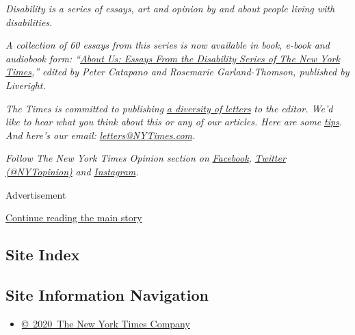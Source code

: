 \emph{Disability is a series of essays, art and opinion by and about
people living with disabilities.}

\emph{A collection of 60 essays from this series is now available in
book, e-book and audiobook form:
``}\href{https://www.aboutusbook.com/}{\emph{About Us: Essays From the
Disability Series of The New York Times}}\emph{,'' edited by Peter
Catapano and Rosemarie Garland-Thomson, published by Liveright.}

\emph{The Times is committed to publishing}
\href{https://www.nytimes3xbfgragh.onion/2019/01/31/opinion/letters/letters-to-editor-new-york-times-women.html}{\emph{a
diversity of letters}} \emph{to the editor. We'd like to hear what you
think about this or any of our articles. Here are some}
\href{https://help.nytimes3xbfgragh.onion/hc/en-us/articles/115014925288-How-to-submit-a-letter-to-the-editor}{\emph{tips}}\emph{.
And here's our email:}
\href{mailto:letters@NYTimes.com}{\emph{letters@NYTimes.com}}\emph{.}

\emph{Follow The New York Times Opinion section on}
\href{https://www.facebookcorewwwi.onion/nytopinion}{\emph{Facebook}}\emph{,}
\href{http://twitter.com/NYTOpinion}{\emph{Twitter (@NYTopinion)}}
\emph{and}
\href{https://www.instagram.com/nytopinion/}{\emph{Instagram}}\emph{.}

Advertisement

\protect\hyperlink{after-bottom}{Continue reading the main story}

\hypertarget{site-index}{%
\subsection{Site Index}\label{site-index}}

\hypertarget{site-information-navigation}{%
\subsection{Site Information
Navigation}\label{site-information-navigation}}

\begin{itemize}
\tightlist
\item
  \href{https://help.nytimes3xbfgragh.onion/hc/en-us/articles/115014792127-Copyright-notice}{©~2020~The
  New York Times Company}
\end{itemize}

